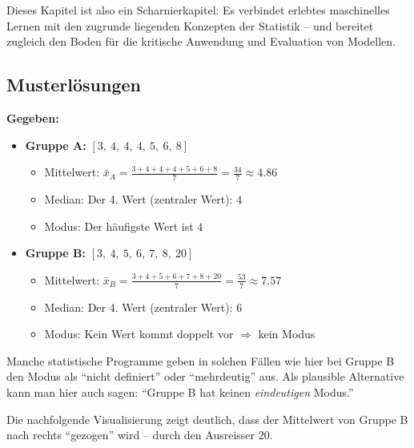 Dieses Kapitel ist also ein Scharnierkapitel: Es verbindet erlebtes maschinelles Lernen mit den zugrunde liegenden Konzepten der Statistik – und bereitet zugleich den Boden für die kritische Anwendung und Evaluation von Modellen.





\subsection*{Musterlösungen}

\begin{aufgabe}{1}
\textbf{Gegeben:}

\begin{itemize}
  \item \textbf{Gruppe A:} $[3,\ 4,\ 4,\ 4,\ 5,\ 6,\ 8]$
  \begin{itemize}
    \item Mittelwert: $\bar{x}_A = \frac{3 + 4 + 4 + 4 + 5 + 6 + 8}{7} = \frac{34}{7} \approx 4.86$
    \item Median: Der 4. Wert (zentraler Wert): $4$
    \item Modus: Der häufigste Wert ist $4$
  \end{itemize}
  \item \textbf{Gruppe B:} $[3,\ 4,\ 5,\ 6,\ 7,\ 8,\ 20]$
  \begin{itemize}
  \item Mittelwert: $\bar{x}_B = \frac{3 + 4 + 5 + 6 + 7 + 8 + 20}{7} = \frac{53}{7} \approx 7.57$
  \item Median: Der 4. Wert (zentraler Wert): $6$
  \item Modus: Kein Wert kommt doppelt vor $\Rightarrow$ kein Modus
\end{itemize}
\end{itemize}

Manche statistische Programme geben in solchen Fällen wie hier bei Gruppe B den Modus als ``nicht definiert'' oder ``mehrdeutig'' aus. Als plausible Alternative kann man hier auch sagen: ``Gruppe B hat keinen \textit{eindeutigen} Modus.''

Die nachfolgende Visualisierung zeigt deutlich, dass der Mittelwert von Gruppe B nach rechts ``gezogen'' wird – durch den Ausreisser $20$.

\begin{figure}[H]
\centering
{}
\end{figure}
\end{aufgabe}

